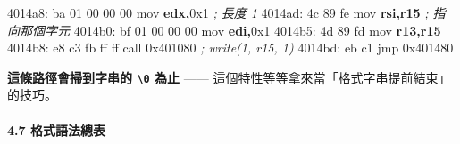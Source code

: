 \documentclass[10pt,a4paper]{article}
\newenvironment{Shaded}{\begin{snugshade}}{\end{snugshade}}
\newcommand{\BaseNTok}[1]{\textcolor[rgb]{0.00,0.00,0.81}{#1}}
\newcommand{\CommentTok}[1]{\textcolor[rgb]{0.56,0.35,0.01}{\textit{#1}}}
\newcommand{\DecValTok}[1]{\textcolor[rgb]{0.00,0.00,0.81}{#1}}
\newcommand{\KeywordTok}[1]{\textcolor[rgb]{0.13,0.29,0.53}{\textbf{#1}}}
\newcommand{\NormalTok}[1]{#1}
\newcommand{\OperatorTok}[1]{\textcolor[rgb]{0.81,0.36,0.00}{\textbf{#1}}}
\renewenvironment{Shaded}{%
  \def\FrameCommand{\fboxsep=3.2pt\colorbox{shadecolor}}%
  \MakeFramed{\advance\hsize-\width\FrameRestore\small}%
}{%
  \endMakeFramed
}
\begin{document}
\begin{Shaded}
\begin{Highlighting}[]
\NormalTok{  4014a8: ba }\DecValTok{01} \DecValTok{00} \DecValTok{00} \DecValTok{00}\NormalTok{     mov  }\KeywordTok{edx}\OperatorTok{,}\BaseNTok{0x1}          \CommentTok{; 長度 1}
\NormalTok{  4014ad: 4c 89 fe           mov  }\KeywordTok{rsi}\OperatorTok{,}\KeywordTok{r15}          \CommentTok{; 指向那個字元}
\NormalTok{  4014b0: bf }\DecValTok{01} \DecValTok{00} \DecValTok{00} \DecValTok{00}\NormalTok{     mov  }\KeywordTok{edi}\OperatorTok{,}\BaseNTok{0x1}
\NormalTok{  4014b5: 4d 89 fd           mov  }\KeywordTok{r13}\OperatorTok{,}\KeywordTok{r15}
\NormalTok{  4014b8: e8 c3 fb ff ff     call }\BaseNTok{0x401080}         \CommentTok{; write(1, r15, 1)}
\NormalTok{  4014bd: eb c1              jmp  }\BaseNTok{0x401480}
\end{Highlighting}
\end{Shaded}

\textbf{這條路徑會掃到字串的 \texttt{\textbackslash{}\allowbreak{}0} 為止} ------
這個特性等等拿來當「格式字串提前結束」的技巧。

\paragraph{4.7 格式語法總表}\label{ux683cux5f0fux8a9eux6cd5ux7e3dux8868}
\end{document}
